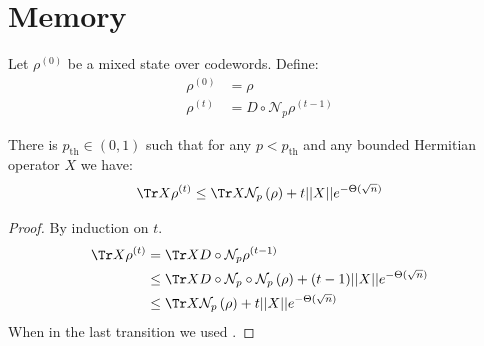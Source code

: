


\section{Memory}


\begin{definition} 
    Let $\rho^{(0)}$ be a mixed state over codewords. Define:
    \begin{equation*}
      \begin{split}
        \rho^{(0)} &=  \rho \\ 
        \rho^{(t)} &=  D \circ \mathcal{N}_{p} \rho^{(t-1)} 
      \end{split}
    \end{equation*}
\end{definition}

  \begin{theorem} There is $p_{\text{th}} \in (0,1)$ such that for any $p < p_{\text{th}}$ and any bounded Hermitian operator $X$ we have: 
    \begin{equation*}
      \Tr X\rho^{(t)} \le \Tr X  \mathcal{N}_{p} \left( \rho \right)  + t||X|| e^{- \Theta( \sqrt{n}) }
    \end{equation*}
\end{theorem}


\begin{proof}
  By induction on $t$.
  \begin{align*}
    \Tr X\rho^{(t)}  &=  \Tr X D \circ \mathcal{N}_{p} \rho^{(t-1)} \\
      & \le   \Tr X D \circ  \mathcal{N}_{p} \circ \mathcal{N}_{p} \left( \rho \right)  + (t-1)||X|| e^{- \Theta( \sqrt{n}) } \\
      & \le \Tr X  \mathcal{N}_{p} \left( \rho \right)  + t||X|| e^{- \Theta( \sqrt{n}) }
  \end{align*}
  When in the last transition we used . 
\end{proof}




